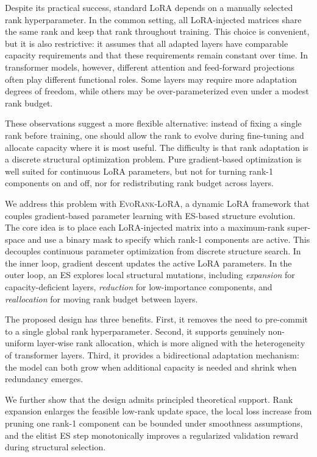 \documentclass{article}
\newcommand{\method}{\textsc{EvoRank-LoRA}}
\begin{document}
Despite its practical success, standard LoRA depends on a manually selected rank hyperparameter. In the common setting, all LoRA-injected matrices share the same rank and keep that rank throughout training. This choice is convenient, but it is also restrictive: it assumes that all adapted layers have comparable capacity requirements and that these requirements remain constant over time. In transformer models, however, different attention and feed-forward projections often play different functional roles. Some layers may require more adaptation degrees of freedom, while others may be over-parameterized even under a modest rank budget.

These observations suggest a more flexible alternative: instead of fixing a single rank before training, one should allow the rank to evolve during fine-tuning and allocate capacity where it is most useful. The difficulty is that rank adaptation is a discrete structural optimization problem. Pure gradient-based optimization is well suited for continuous LoRA parameters, but not for turning rank-1 components on and off, nor for redistributing rank budget across layers.

We address this problem with \method, a dynamic LoRA framework that couples gradient-based parameter learning with ES-based structure evolution. The core idea is to place each LoRA-injected matrix into a maximum-rank super-space and use a binary mask to specify which rank-1 components are active. This decouples continuous parameter optimization from discrete structure search. In the inner loop, gradient descent updates the active LoRA parameters. In the outer loop, an ES explores local structural mutations, including \emph{expansion} for capacity-deficient layers, \emph{reduction} for low-importance components, and \emph{reallocation} for moving rank budget between layers.

The proposed design has three benefits. First, it removes the need to pre-commit to a single global rank hyperparameter. Second, it supports genuinely non-uniform layer-wise rank allocation, which is more aligned with the heterogeneity of transformer layers. Third, it provides a bidirectional adaptation mechanism: the model can both grow when additional capacity is needed and shrink when redundancy emerges.

We further show that the design admits principled theoretical support. Rank expansion enlarges the feasible low-rank update space, the local loss increase from pruning one rank-1 component can be bounded under smoothness assumptions, and the elitist ES step monotonically improves a regularized validation reward during structural selection.
\end{document}
